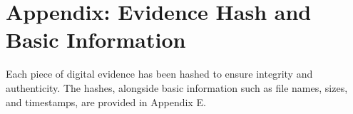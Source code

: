 \documentclass{article}
\begin{document}
    \section{\fontsize{14pt}{17pt}\selectfont Appendix: Evidence Hash and Basic Information}\label{sec:selectfont-appendix:-evidence-hash-and-basic-information}
    Each piece of digital evidence has been hashed to ensure integrity and authenticity.
    The hashes, alongside basic information such as file names, sizes, and timestamps, are provided in Appendix E.
\end{document}
